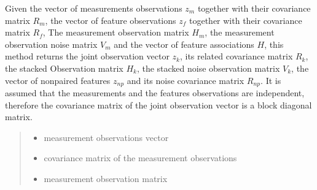 \documentclass[letterpaper,10pt,english]{sphinxmanual}
\begin{document}
\begin{fulllineitems}
\begin{fulllineitems}
\begin{quote}
\begin{description}
\end{description}\end{quote}

\end{fulllineitems}


\begin{fulllineitems}
\label{\detokenize{FEKFMBLocalization:FEKFMBL.FEKFMBL.StackMeasurementsAndFeatures}}
\pysigstartsignatures
{}
\pysigstopsignatures
\sphinxAtStartPar
Given the vector of  measurements observations \(z_m\) together with their covariance matrix \(R_m\),
the vector of feature observations \(z_f\) together with their covariance matrix \(R_f\), The measurement observation matrix \(H_m\), the
measurement observation noise matrix \(V_m\) and the vector of feature associations \(H\), this method
returns the joint observation vector \(z_k\), its related covariance matrix \(R_k\), the stacked
Observation matrix \(H_k\), the stacked noise observation matrix \(V_k\), the vector of non\sphinxhyphen{}paired features
\(z_{np}\) and its noise covariance matrix \(R_{np}\).
It is assumed that the measurements and the features observations are independent, therefore the covariance matrix
of the joint observation vector is a block diagonal matrix.
\begin{quote}\begin{description}
\begin{itemize}
\item {} 
\sphinxAtStartPar
{} \textendash{} measurement observations vector

\item {} 
\sphinxAtStartPar
{} \textendash{} covariance matrix of the measurement observations

\item {} 
\sphinxAtStartPar
{} \textendash{} measurement observation matrix


\end{itemize}
\end{description}
\end{quote}
\end{fulllineitems}
\end{fulllineitems}
\end{document}
